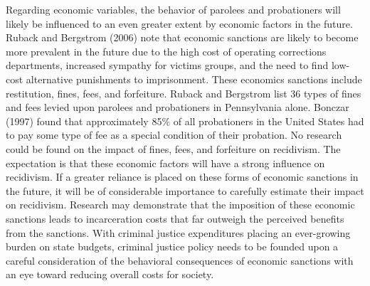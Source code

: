 Regarding economic variables, the behavior of parolees and probationers will likely be influenced to an even greater extent by economic factors in the future.  Ruback and Bergstrom (2006) note that economic sanctions are likely to become more prevalent in the future due to the high cost of operating corrections departments, increased sympathy for victims groups, and the need to find low-cost alternative punishments to imprisonment.  These economics sanctions include restitution, fines, fees, and forfeiture.  Ruback and Bergstrom list 36 types of fines and fees levied upon parolees and probationers in Pennsylvania alone.  Bonczar (1997) found that approximately 85\% of all probationers in the United States had to pay some type of fee as a special condition of their probation.  No research could be found on the impact of fines, fees, and forfeiture on recidivism.  The expectation is that these economic factors will have a strong influence on recidivism.  If a greater reliance is placed on these forms of economic sanctions in the future, it will be of considerable importance to carefully estimate their impact on recidivism.  Research may demonstrate that the imposition of these economic sanctions leads to incarceration costs that far outweigh the perceived benefits from the sanctions.  With criminal justice expenditures placing an ever-growing burden on state budgets, criminal justice policy needs to be founded upon a careful consideration of the behavioral consequences of economic sanctions with an eye toward reducing overall costs for society.



